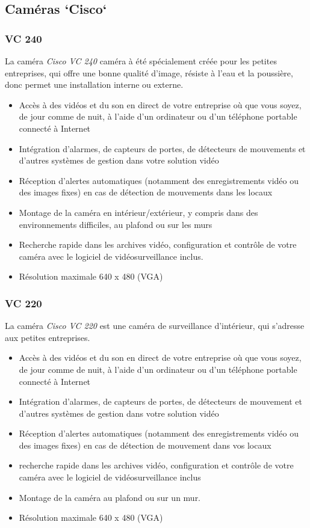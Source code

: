 \subsection{Caméras `Cisco`}
\subsubsection{VC 240}
La caméra \textit{Cisco VC 240} caméra à été spécialement créée pour les petites
entreprises, qui offre une bonne qualité d'image, résiste à l'eau et la poussière, donc permet une
installation interne ou externe.
\begin{itemize}
  \item Accès à des vidéos et du son en direct de votre entreprise où que vous
  soyez, de jour comme de nuit, à l'aide d'un ordinateur ou d'un téléphone
  portable connecté à Internet
  \item Intégration d'alarmes, de capteurs de portes, de détecteurs de mouvements
  et d'autres systèmes de gestion dans votre solution vidéo
  \item Réception d'alertes automatiques (notamment des enregistrements vidéo ou
  des images fixes) en cas de détection de mouvements dans les locaux
  \item Montage de la caméra en intérieur/extérieur, y compris dans des
  environnements difficiles, au plafond ou sur les murs
  \item Recherche rapide dans les archives vidéo, configuration et contrôle de
  votre caméra avec le logiciel de vidéosurveillance inclus.
  \item Résolution maximale 640 x 480 (VGA)
\end{itemize}
\subsubsection{VC 220}
La caméra \textit{Cisco VC 220} est une caméra de surveillance d'intérieur, qui
s'adresse aux petites entreprises.
\begin{itemize}
  \item Accès à des vidéos et du son en direct de votre entreprise où que vous
  soyez, de jour comme de nuit, à l'aide d'un ordinateur ou d'un téléphone
  portable connecté à Internet
  \item Intégration d'alarmes, de capteurs de portes, de détecteurs de mouvement
  et d'autres systèmes de gestion dans votre solution vidéo
  \item Réception d'alertes automatiques (notamment des enregistrements vidéo ou
  des images fixes) en cas de détection de mouvement dans vos locaux
  \item recherche rapide dans les archives vidéo, configuration et contrôle de
  votre caméra avec le logiciel de vidéosurveillance inclus
  \item Montage de la caméra au plafond ou sur un mur.
  \item Résolution maximale 640 x 480 (VGA)
  \newline
\end{itemize}


